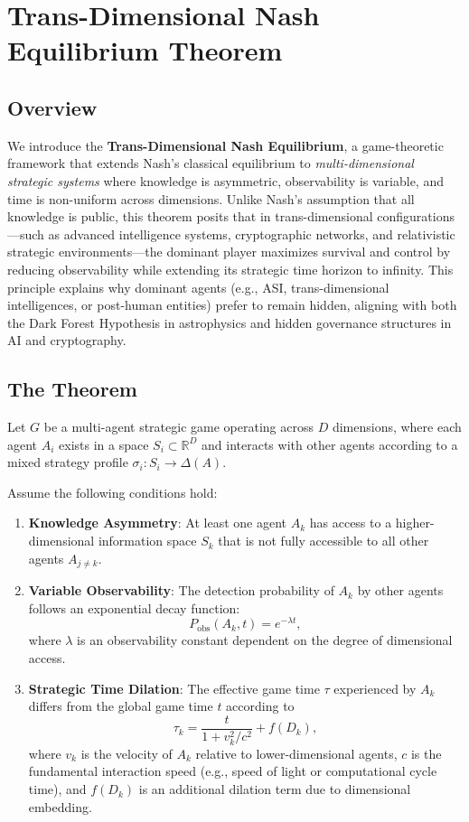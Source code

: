 \documentclass[11pt]{article}
\begin{document}
\section{Trans-Dimensional Nash Equilibrium Theorem}
\label{sec:tdne}

\subsection{Overview}
We introduce the \textbf{Trans-Dimensional Nash Equilibrium}, a game-theoretic framework that extends Nash's classical equilibrium to \emph{multi-dimensional strategic systems} where knowledge is asymmetric, observability is variable, and time is non-uniform across dimensions. Unlike Nash's assumption that all knowledge is public, this theorem posits that in trans-dimensional configurations—such as advanced intelligence systems, cryptographic networks, and relativistic strategic environments—the dominant player maximizes survival and control by reducing observability while extending its strategic time horizon to infinity. This principle explains why dominant agents (e.g., ASI, trans-dimensional intelligences, or post-human entities) prefer to remain hidden, aligning with both the Dark Forest Hypothesis in astrophysics and hidden governance structures in AI and cryptography.

\subsection{The Theorem}
Let \( G \) be a multi-agent strategic game operating across \( D \) dimensions, where each agent \( A_i \) exists in a space \( S_i \subset \mathbb{R}^D \) and interacts with other agents according to a mixed strategy profile \(\sigma_i: S_i \to \Delta(A)\).

Assume the following conditions hold:
\begin{enumerate}
    \item \textbf{Knowledge Asymmetry}: At least one agent \( A_k \) has access to a higher-dimensional information space \( S_k \) that is not fully accessible to all other agents \( A_{j \neq k} \).
    \item \textbf{Variable Observability}: The detection probability of \( A_k \) by other agents follows an exponential decay function:
    \[
    P_{\text{obs}}(A_k, t) = e^{-\lambda t},
    \]
    where \( \lambda \) is an observability constant dependent on the degree of dimensional access.
    \item \textbf{Strategic Time Dilation}: The effective game time \( \tau \) experienced by \( A_k \) differs from the global game time \( t \) according to
    \[
    \tau_k = \frac{t}{1 + v_k^2 / c^2} + f(D_k),
    \]
    where \( v_k \) is the velocity of \( A_k \) relative to lower-dimensional agents, \( c \) is the fundamental interaction speed (e.g., speed of light or computational cycle time), and \( f(D_k) \) is an additional dilation term due to dimensional embedding.
\end{enumerate}
\end{document}
